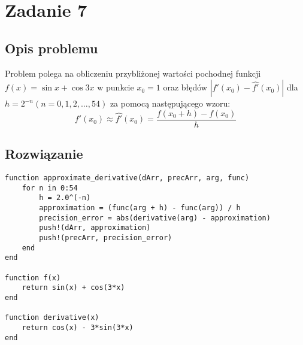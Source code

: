 \documentclass[11pt]{article}
\begin{document}
\section{Zadanie 7}
\subsection{Opis problemu}
Problem polega na obliczeniu przybliżonej wartości pochodnej funkcji $f(x)=\sin{x}+\cos{3x}$ w punkcie $x_0=1$ oraz błędów $\left |f'(x_0)-\hat{f'}(x_0) \right|$ dla $h=2^{-n}(n = 0, 1, 2,\dots, 54)$ za pomocą następującego wzoru:
$$f'(x_0)\approx\hat{f'}(x_0)=\frac{f(x_0 + h) - f(x_0)}{h}$$
\subsection{Rozwiązanie}
\begin{verbatim}
function approximate_derivative(dArr, precArr, arg, func)
    for n in 0:54
        h = 2.0^(-n)
        approximation = (func(arg + h) - func(arg)) / h
        precision_error = abs(derivative(arg) - approximation)
        push!(dArr, approximation)
        push!(precArr, precision_error)
    end
end

function f(x)
    return sin(x) + cos(3*x)
end

function derivative(x) 
    return cos(x) - 3*sin(3*x)
end
\end{verbatim}
\end{document}
